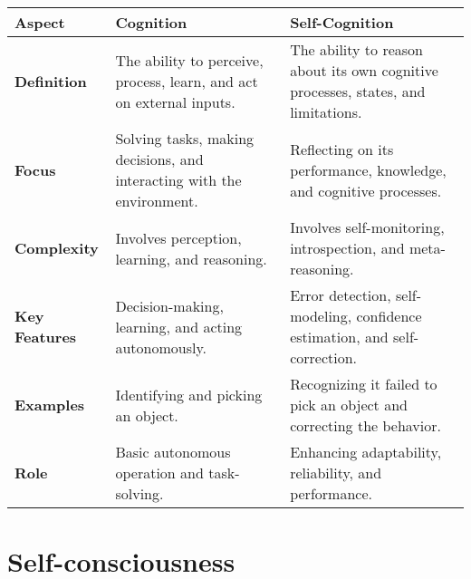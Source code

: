 \begin{tabular}{|l|l|l|}
    \hline
    \textbf{Aspect}       & \textbf{Cognition}                                                     & \textbf{Self-Cognition}                                                           \\ \hline
    \textbf{Definition}   & The ability to perceive, process, learn, and act on external inputs. & The ability to reason about its own cognitive processes, states, and limitations. \\ \hline
    \textbf{Focus}        & Solving tasks, making decisions, and interacting with the environment. & Reflecting on its performance, knowledge, and cognitive processes. \\ \hline
    \textbf{Complexity}   & Involves perception, learning, and reasoning.                          & Involves self-monitoring, introspection, and meta-reasoning.                      \\ \hline
    \textbf{Key Features} & Decision-making, learning, and acting autonomously.                    & Error detection, self-modeling, confidence estimation, and self-correction.       \\ \hline
    \textbf{Examples}     & Identifying and picking an object.                                     & Recognizing it failed to pick an object and correcting the behavior.              \\ \hline
    \textbf{Role}         & Basic autonomous operation and task-solving.                           & Enhancing adaptability, reliability, and performance.                             \\ \hline
\end{tabular}


\section{Self-consciousness}


